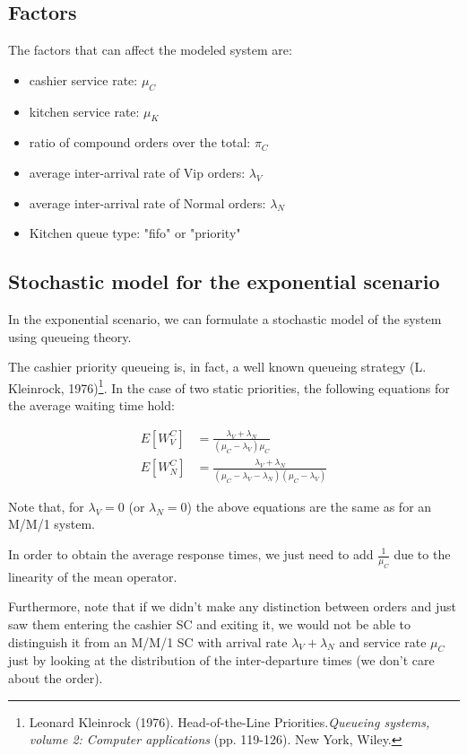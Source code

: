 \subsection{Factors}
The factors that can affect the modeled system are:
\begin{itemize}
    \item cashier service rate: $\mu_C$
    \item kitchen service rate: $\mu_K$
    \item ratio of compound orders over the total: $\pi_C$ 
    \item average inter-arrival rate of Vip orders: $\lambda_V$
    \item average inter-arrival rate of Normal orders: $\lambda_N$
    \item Kitchen queue type: "fifo" or "priority"
\end{itemize}

\subsection{Stochastic model for the exponential scenario}
In the exponential scenario, we can formulate a stochastic model of the system
using queueing theory.

The cashier priority queueing is, in fact, a well known queueing 
strategy (L. Kleinrock, 1976)\footnote{Leonard Kleinrock (1976). Head-of-the-Line Priorities.\emph{Queueing systems, volume 2: Computer applications} (pp. 119-126). New York, Wiley.}. In the case of two static priorities, the following equations for
the average waiting time hold:

\begin{align}
    E[W^C_{V}] &= \frac{\lambda_V + \lambda_N}{(\mu_C-\lambda_{V})\mu_C} \label{eq:waitvip}\\
    E[W^C_{N}] &= \frac{\lambda_V + \lambda_N}{(\mu_C-\lambda_{V}-\lambda_N)(\mu_C-\lambda_{V})} \label{eq:waitnorm}
\end{align}

Note that, for $\lambda_V = 0$ (or $\lambda_N = 0$) the above equations are the 
same as for an M/M/1 system.

In order to obtain the average response times, we just need to add $\frac{1}{\mu_C}$
due to the linearity of the mean operator.

Furthermore, note that if we didn't make any distinction between orders and just 
saw them entering the cashier SC and exiting it, we would not be able to 
distinguish it from an M/M/1 SC with arrival rate $\lambda_V + \lambda_N$ and 
service rate $\mu_C$ just by looking at the distribution of the 
inter-departure times (we don't care about the order).

